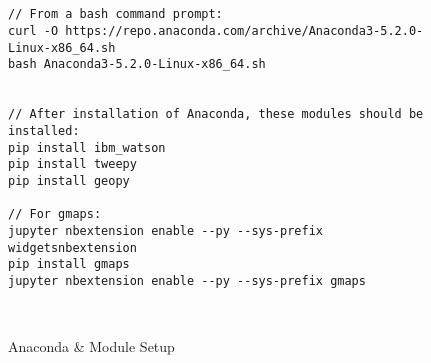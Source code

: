 \documentclass[12pt, oneside]{article}
\begin{document}
\begin{figure}[H]
\begin{lstlisting}


// From a bash command prompt:
curl -O https://repo.anaconda.com/archive/Anaconda3-5.2.0-Linux-x86_64.sh
bash Anaconda3-5.2.0-Linux-x86_64.sh


// After installation of Anaconda, these modules should be installed:
pip install ibm_watson
pip install tweepy
pip install geopy

// For gmaps:
jupyter nbextension enable --py --sys-prefix widgetsnbextension
pip install gmaps
jupyter nbextension enable --py --sys-prefix gmaps

\end{lstlisting}
\caption{Anaconda \& Module Setup}\
\label{fig:code}
\end{figure}
\end{document}
